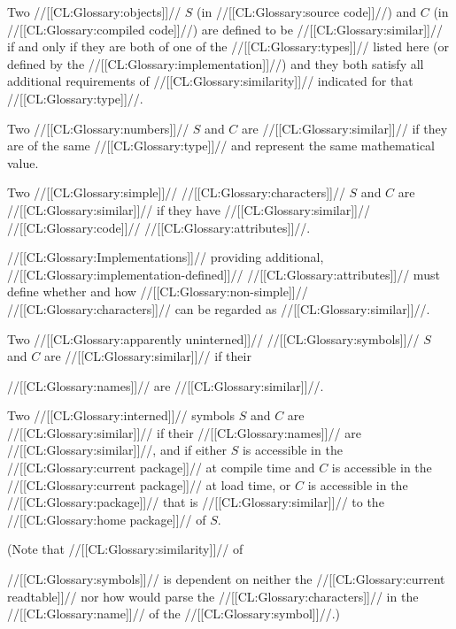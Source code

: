
Two //[[CL:Glossary:objects]]// $S$ (in //[[CL:Glossary:source code]]//) and $C$ (in //[[CL:Glossary:compiled code]]//)
     are defined to be //[[CL:Glossary:similar]]// if and only if 
     they are both of one of the //[[CL:Glossary:types]]// listed here
      (or defined by the //[[CL:Glossary:implementation]]//) 
 and they both satisfy all additional requirements of //[[CL:Glossary:similarity]]// 
      indicated for that //[[CL:Glossary:type]]//.

\beginlist

  Two //[[CL:Glossary:numbers]]// $S$ and $C$ are //[[CL:Glossary:similar]]// if they are of the same //[[CL:Glossary:type]]// and represent the same mathematical value.

 

Two //[[CL:Glossary:simple]]// //[[CL:Glossary:characters]]// $S$ and $C$ are //[[CL:Glossary:similar]]//  if they have //[[CL:Glossary:similar]]// //[[CL:Glossary:code]]// //[[CL:Glossary:attributes]]//.

//[[CL:Glossary:Implementations]]// providing additional, //[[CL:Glossary:implementation-defined]]//  //[[CL:Glossary:attributes]]// must define whether and how //[[CL:Glossary:non-simple]]// //[[CL:Glossary:characters]]//  can be regarded as //[[CL:Glossary:similar]]//.


Two //[[CL:Glossary:apparently uninterned]]// //[[CL:Glossary:symbols]]// $S$ and $C$ are //[[CL:Glossary:similar]]// if their

//[[CL:Glossary:names]]// are //[[CL:Glossary:similar]]//.

 Two //[[CL:Glossary:interned]]// symbols $S$ and $C$ are //[[CL:Glossary:similar]]//  if their //[[CL:Glossary:names]]// are //[[CL:Glossary:similar]]//, and if either $S$ is accessible in the //[[CL:Glossary:current package]]// at compile time
          and $C$ is accessible in the //[[CL:Glossary:current package]]// at load time,
       or $C$ is accessible in the //[[CL:Glossary:package]]// that is //[[CL:Glossary:similar]]// to
          the //[[CL:Glossary:home package]]// of $S$.

(Note that //[[CL:Glossary:similarity]]// of

//[[CL:Glossary:symbols]]// is dependent on neither the //[[CL:Glossary:current readtable]]// nor how  would parse the //[[CL:Glossary:characters]]// in the //[[CL:Glossary:name]]// of the //[[CL:Glossary:symbol]]//.)

